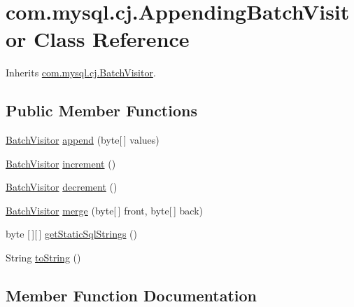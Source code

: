 \hypertarget{classcom_1_1mysql_1_1cj_1_1_appending_batch_visitor}{}\section{com.\+mysql.\+cj.\+Appending\+Batch\+Visitor Class Reference}
\label{classcom_1_1mysql_1_1cj_1_1_appending_batch_visitor}


Inherits \mbox{\hyperlink{interfacecom_1_1mysql_1_1cj_1_1_batch_visitor}{com.\+mysql.\+cj.\+Batch\+Visitor}}.

\subsection*{Public Member Functions}
\begin{DoxyCompactItemize}
\item 
\mbox{\hyperlink{interfacecom_1_1mysql_1_1cj_1_1_batch_visitor}{Batch\+Visitor}} \mbox{\hyperlink{classcom_1_1mysql_1_1cj_1_1_appending_batch_visitor_ab8ff7b399d4a2f5c99b0a08afae95012}{append}} (byte\mbox{[}$\,$\mbox{]} values)
\item 
\mbox{\hyperlink{interfacecom_1_1mysql_1_1cj_1_1_batch_visitor}{Batch\+Visitor}} \mbox{\hyperlink{classcom_1_1mysql_1_1cj_1_1_appending_batch_visitor_ad594c2e002438dcbc9079af8ee99c3c1}{increment}} ()
\item 
\mbox{\hyperlink{interfacecom_1_1mysql_1_1cj_1_1_batch_visitor}{Batch\+Visitor}} \mbox{\hyperlink{classcom_1_1mysql_1_1cj_1_1_appending_batch_visitor_a1f3469887d7b40e881ceb47bb912ec07}{decrement}} ()
\item 
\mbox{\hyperlink{interfacecom_1_1mysql_1_1cj_1_1_batch_visitor}{Batch\+Visitor}} \mbox{\hyperlink{classcom_1_1mysql_1_1cj_1_1_appending_batch_visitor_a75f638cd1726c922c747767d693c0288}{merge}} (byte\mbox{[}$\,$\mbox{]} front, byte\mbox{[}$\,$\mbox{]} back)
\item 
byte \mbox{[}$\,$\mbox{]}\mbox{[}$\,$\mbox{]} \mbox{\hyperlink{classcom_1_1mysql_1_1cj_1_1_appending_batch_visitor_a3f735090eea41d6ecc28c9d0c24e170a}{get\+Static\+Sql\+Strings}} ()
\item 
String \mbox{\hyperlink{classcom_1_1mysql_1_1cj_1_1_appending_batch_visitor_a69995f09d9262780787f48744a145b21}{to\+String}} ()
\end{DoxyCompactItemize}


\subsection{Member Function Documentation}
\mbox{\label{classcom_1_1mysql_1_1cj_1_1_appending_batch_visitor_ab8ff7b399d4a2f5c99b0a08afae95012}} 
